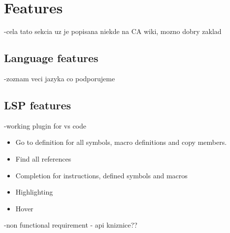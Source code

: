 \chapter{Features}


-cela tato sekcia uz je popisana niekde na CA wiki, mozno dobry zaklad

\section{Language features}
-zoznam veci jazyka co podporujeme


\section{LSP features}
-working plugin for vs code

\begin{itemize}
	\item Go to definition for all symbols, macro definitions and copy members.
	\item Find all references
	\item Completion for instructions, defined symbols and macros
	\item Highlighting
	\item Hover
\end{itemize}



-non functional requirement - api kniznice??